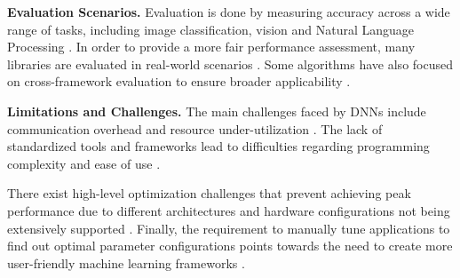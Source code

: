 \textbf{Evaluation Scenarios.}
Evaluation is done by measuring accuracy across a wide range of tasks, including image classification,
vision and Natural Language Processing . In order to provide a more
fair performance assessment, many libraries are evaluated in real-world scenarios .
Some algorithms have also focused on cross-framework evaluation to ensure broader applicability
.

\textbf{Limitations and Challenges.}
The main challenges faced by DNNs include communication overhead and resource under-utilization
. The lack of standardized tools and frameworks lead
to difficulties regarding programming complexity and ease of use .

There exist high-level optimization challenges that prevent achieving peak performance due to
different architectures and hardware configurations not being extensively supported
. Finally, the requirement to manually tune applications to find out optimal
parameter configurations points towards the need to create more user-friendly machine learning
frameworks .


